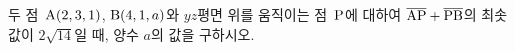 두 점~$\mathrm{A}(2{,}\mkern3mu\mathopen{}3{,}\mkern3mu\mathopen{}1)$, $\mathrm{B}(4{,}\mkern3mu\mathopen{}1{,}\mkern3mu\mathopen{}a)$와 $yz$평면 위를 움직이는 점~$\mathrm{P}$에 대하여 $\overline{\mathrm{AP}}+\overline{\mathrm{PB}}$의 최솟값이 $2\sqrt{14}$일 때, 양수 $a$의 값을 구하시오.
